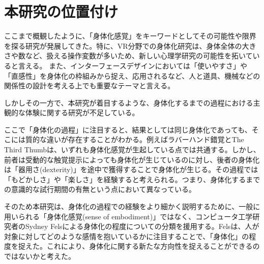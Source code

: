 \section{本研究の位置付け}
ここまで概観したように、「身体化感覚」をキーワードとしてその可能性や限界を探る研究が発展してきた。特に、VR分野での身体化研究は、身体全体の大きさや数など、扱える操作変数が多いため、新しい心理学研究の可能性を拓いていると言える。
また、インターフェースデザインにおいては「使いやすさ」や「直感性」を身体化の枠組みから捉え、応用されるなど、人と道具、機械などの関係性の設計を考える上でも重要なテーマと言える。

しかしその一方で、本研究が着目するような、身体化するまでの過程における主観的な体験に関する研究が不足している。

ここで「身体化の過程」に注目すると、結果としては同じ身体化であっても、そこには質的な違いが存在することがわかる。例えばラバーハンド錯覚とThe Third Thumbは、いずれも身体化感覚が生起している点では共通する。しかし、前者は受動的な触覚提示によっても身体化が生じているのに対し、後者の身体化は「器用さ(dexterity)」を途中で獲得することで身体化が生じる。その過程では「もどかしさ」や「楽しさ」を経験すると考えられる。つまり、身体化するまでの意識的な試行期間の有無という点において異なっている。



そのため本研究は、身体化の過程での経験をより細かく説明するために、一般に用いられる「身体化感覚(sense of embodiment)」ではなく、コンピュータ工学研究者のSydney Felsによる身体化の程度についての分類を援用する。Felsは、人が対象に対してどのような感情を抱いているかに注目することで、「身体化」の程度を捉えた。これにより、身体化に関する新たな方向性を捉えることができるのではないかと考えた。


